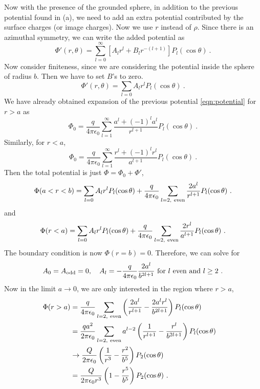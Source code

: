 \documentclass[12pt]{article}
\begin{document}
\newpage
{} Now with the presence of the grounded sphere, in addition to the previous potential found in (a), we need to add an extra potential contributed by the surface charges (or image charges). Now we use $r$ instead of $\rho$. Since there is an azimuthal symmetry, we can write the added potential as
\begin{equation}
    \Phi'(r, \theta) = \sum_{l = 0}^\infty [A_l r^l + B_l r^{-(l+1)}] P_l(\cos \theta)~.
\end{equation}
Now consider finiteness, since we are considering the potential inside the sphere of radius $b$. Then we have to set $B$'s to zero.
\begin{equation}
    \Phi'(r, \theta) = \sum_{l = 0} A_l r^l P_l(\cos \theta)~.
\end{equation}
We have already obtained expansion of the previous potential \eqref{eqn:potential} for $r > a$ as
\begin{equation}
    \Phi_0 = \frac{q}{4\pi \epsilon_0} \sum_{l = 1}^\infty \frac{a^l + (-1)^l a^l}{r^{l+1}} P_l(\cos \theta)~.
\end{equation}
Similarly, for $r < a$,
\begin{equation}
    \Phi_0 = \frac{q}{4\pi \epsilon_0} \sum_{l = 1}^\infty \frac{r^l + (-1)^{l} r^l}{a^{l+1}} P_l(\cos \theta)~.
\end{equation}
Then the total potential is just $\Phi = \Phi_0 + \Phi'$,
\begin{equation}
    \Phi(a < r < b) = \sum_{l = 0} A_l r^l P_l(\cos \theta) + \frac{q}{4\pi \epsilon_0} \sum_{l =2,~{\rm even}} \frac{2 a^l}{r^{l+1}} P_l(\cos \theta)~.
\end{equation}
and
\begin{equation}
    \Phi(r < a) = \sum_{l = 0} A_l r^l P_l(\cos \theta) + \frac{q}{4\pi \epsilon_0} \sum_{l = 2, ~{\rm even}} \frac{2r^l}{a^{l+1}} P_l(\cos\theta)~.
\end{equation}
The boundary condition is now $\Phi(r = b) = 0$. Therefore, we can solve for
\begin{equation}
    A_0 = A_{\rm odd} = 0, \quad A_l = - \frac{q}{4\pi \epsilon_0} \frac{2 a^l}{b^{2l+1}} ~{\rm for}~l~{\rm even~and}~l\ge 2~.
\end{equation}
Now in the limit $a \to 0$, we are only interested in the region where $r > a$,
\begin{align}
    \Phi(r > a) &= \frac{q}{4\pi \epsilon_0}\sum_{l = 2,~{\rm even}}  \left(\frac{2a^l}{r^{l+1}} - \frac{2a^lr^l}{b^{2l+1}}\right) P_l(\cos \theta) \cr
    &= \frac{q a^2}{2\pi \epsilon_0}\sum_{l = 2,~{\rm even}} a^{l-2} \left (\frac{1}{r^{l+1}} - \frac{r^l}{b^{2l+1}}\right) P_l(\cos \theta) \cr
    & \to \frac{Q}{2\pi \epsilon_0} \left(\frac{1}{r^3} - \frac{r^2}{b^5}\right)P_2(\cos \theta) \cr
    &= \frac{Q}{2\pi \epsilon_0 r^3} \left(1 - \frac{r^5}{b^5}\right)P_2(\cos \theta)~.
\end{align}
\end{document}
